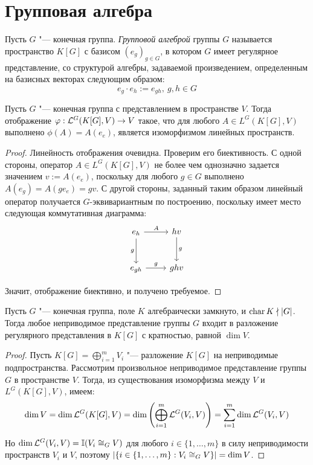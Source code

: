 \section{Групповая алгебра}

\begin{definition}
	Пусть $G$ "--- конечная группа. \textit{Групповой алгеброй} группы $G$ называется пространство $K[G]$ с базисом $(e_g)_{g \in G}$, в котором $G$ имеет регулярное представление, со структурой алгебры, задаваемой произведением, определенным на базисных векторах следующим образом:
	\[e_g \cdot e_h := e_{gh},~g, h \in G\]
\end{definition}

\begin{proposition}
	Пусть $G$ "--- конечная группа с представлением в пространстве $V$. Тогда отображение $\varphi: \mathcal L^G(K[G], V) \to V$ такое, что для любого $A \in L^G(K[G], V)$ выполнено $\phi(A) = A(e_e)$, является изоморфизмом линейных пространств.
\end{proposition}

\begin{proof}
	Линейность отображения очевидна. Проверим его биективность. С одной стороны, оператор $A \in L^G(K[G], V)$ не \pagebreak более чем однозначно задается значением $v := A(e_e)$, поскольку для любого $g \in G$ выполнено $A(e_g) = A(ge_e) = gv$. С другой стороны, заданный таким образом линейный оператор получается $G$-эквивариантным по построению, поскольку имеет место следующая коммутативная диаграмма:
	\[
	\begin{tikzcd}[row sep = large]
		e_h \arrow[swap]{d}{g} \arrow{r}{A} & hv \arrow{d}{g}\\
		e_{gh} \arrow{r}{g} & ghv
	\end{tikzcd}
	\]
	
	Значит, отображение биективно, и получено требуемое.
\end{proof}

\begin{corollary}
	Пусть $G$ "--- конечная группа, поле $K$ алгебраически замкнуто, и $\operatorname{char}{K} \nmid |G|$. Тогда любое неприводимое представление группы $G$ входит в разложение регулярного представления в $K[G]$ с кратностью, равной $\dim{V}$.
\end{corollary}

\begin{proof}
	Пусть $K[G] = \bigoplus_{i = 1}^m V_i$ "--- разложение $K[G]$ на неприводимые подпространства. Рассмотрим произвольное неприводимое представление группы $G$ в пространстве $V$. Тогда, из существования изоморфизма между $V$ и $L^G(K[G], V)$, имеем:
	\[\dim{V} = \dim\mathcal L^G(K[G], V) = \dim \left(\bigoplus_{i = 1}^m\mathcal L^G(V_i, V)\right) = \sum_{i = 1}^m\dim\mathcal L^G(V_i, V)\]
	
	Но $\dim\mathcal L^G(V_i, V) = \mathbb I(V_i \cong_G V)$ для любого $i \in \{1, \dotsc, m\}$ в силу неприводимости пространств $V_i$ и $V$, поэтому $|\{i \in \{1, \dotsc, m\}: V_i \cong_G V\}| = \dim{V}$.
\end{proof}

